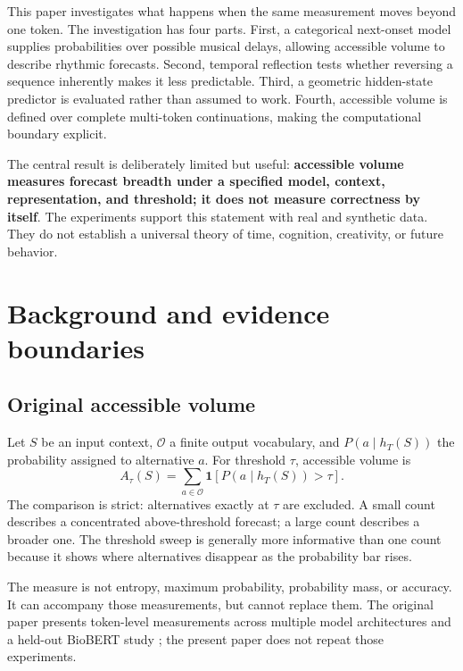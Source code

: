 \documentclass[11pt,a4paper]{article}
\begin{document}
This paper investigates what happens when the same measurement moves beyond one token. The investigation has four parts. First, a categorical next-onset model supplies probabilities over possible musical delays, allowing accessible volume to describe rhythmic forecasts. Second, temporal reflection tests whether reversing a sequence inherently makes it less predictable. Third, a geometric hidden-state predictor is evaluated rather than assumed to work. Fourth, accessible volume is defined over complete multi-token continuations, making the computational boundary explicit.

The central result is deliberately limited but useful: \textbf{accessible volume measures forecast breadth under a specified model, context, representation, and threshold; it does not measure correctness by itself}. The experiments support this statement with real and synthetic data. They do not establish a universal theory of time, cognition, creativity, or future behavior.

\section{Background and evidence boundaries}
\subsection{Original accessible volume}
Let $S$ be an input context, $\mathcal{O}$ a finite output vocabulary, and $P(a\mid h_T(S))$ the probability assigned to alternative $a$. For threshold $\tau$, accessible volume is
\begin{equation}
A_\tau(S)=\sum_{a\in\mathcal{O}}\mathbf{1}\!\left[P(a\mid h_T(S))>\tau\right].
\label{eq:original-volume}
\end{equation}
The comparison is strict: alternatives exactly at $\tau$ are excluded. A small count describes a concentrated above-threshold forecast; a large count describes a broader one. The threshold sweep is generally more informative than one count because it shows where alternatives disappear as the probability bar rises.

The measure is not entropy, maximum probability, probability mass, or accuracy. It can accompany those measurements, but cannot replace them. The original paper presents token-level measurements across multiple model architectures and a held-out BioBERT study \cite{kloster2026significance}; the present paper does not repeat those experiments.
\end{document}
